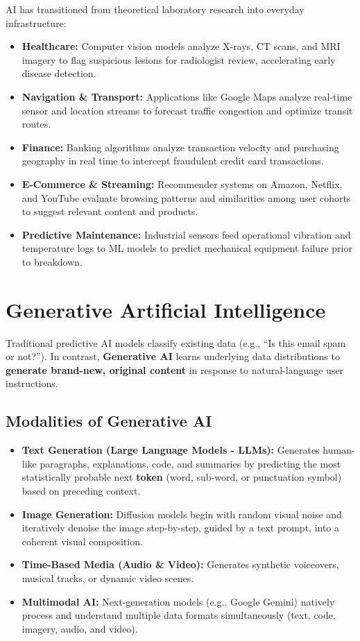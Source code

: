 AI has transitioned from theoretical laboratory research into everyday infrastructure:
\begin{itemize}[leftmargin=1.2em]
    \item \textbf{Healthcare:} Computer vision models analyze X-rays, CT scans, and MRI imagery to flag suspicious lesions for radiologist review, accelerating early disease detection.
    \item \textbf{Navigation \& Transport:} Applications like Google Maps analyze real-time sensor and location streams to forecast traffic congestion and optimize transit routes.
    \item \textbf{Finance:} Banking algorithms analyze transaction velocity and purchasing geography in real time to intercept fraudulent credit card transactions.
    \item \textbf{E-Commerce \& Streaming:} Recommender systems on Amazon, Netflix, and YouTube evaluate browsing patterns and similarities among user cohorts to suggest relevant content and products.
    \item \textbf{Predictive Maintenance:} Industrial sensors feed operational vibration and temperature logs to ML models to predict mechanical equipment failure prior to breakdown.
\end{itemize}

\section{Generative Artificial Intelligence}

Traditional predictive AI models classify existing data (e.g., ``Is this email spam or not?''). In contrast, \textbf{Generative AI} learns underlying data distributions to \textbf{generate brand-new, original content} in response to natural-language user instructions.

\subsection{Modalities of Generative AI}
\begin{itemize}[leftmargin=1.2em]
    \item \textbf{Text Generation (Large Language Models - LLMs):} Generates human-like paragraphs, explanations, code, and summaries by predicting the most statistically probable next \textbf{token} (word, sub-word, or punctuation symbol) based on preceding context.
    \item \textbf{Image Generation:} Diffusion models begin with random visual noise and iteratively denoise the image step-by-step, guided by a text prompt, into a coherent visual composition.
    \item \textbf{Time-Based Media (Audio \& Video):} Generates synthetic voiceovers, musical tracks, or dynamic video scenes.
    \item \textbf{Multimodal AI:} Next-generation models (e.g., Google Gemini) natively process and understand multiple data formats simultaneously (text, code, imagery, audio, and video).
\end{itemize}

